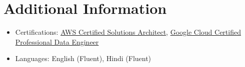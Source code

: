 \documentclass[a4paper,10pt]{article} %
\begin{document}
\vspace{0.7em} %

\section*{Additional Information}
\begin{itemize}[leftmargin=0.3in, itemsep=3pt, topsep=2pt]
    \item Certifications: \href{https://aws.amazon.com/certification/certified-solutions-architect-associate/}{AWS Certified Solutions Architect}, \href{https://cloud.google.com/certification/data-engineer}{Google Cloud Certified Professional Data Engineer}
    \item Languages: English (Fluent), Hindi (Fluent)
\end{itemize}
\end{document}
